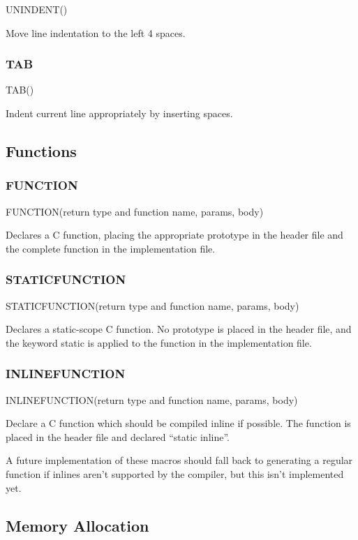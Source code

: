 \documentclass{article}
\begin{document}
UNINDENT()

Move line indentation to the left 4 spaces.


\subsubsection{TAB}

TAB()

Indent current line appropriately by inserting spaces.


\subsection{Functions}


\subsubsection{FUNCTION}

FUNCTION(return type and function name, params, body)

Declares a C function, placing the appropriate prototype in the header
file and the complete function in the implementation file.


\subsubsection{STATICFUNCTION}

STATICFUNCTION(return type and function name, params, body)

Declares a static-scope C function. No prototype is placed in the
header file, and the keyword static is applied to the function in
the implementation file.


\subsubsection{INLINEFUNCTION}

INLINEFUNCTION(return type and function name, params, body)

Declare a C function which should be compiled inline if possible.
The function is placed in the header file and declared ``static inline''.

A future implementation of these macros should fall back to
generating a regular function if inlines aren't supported by the
compiler, but this isn't implemented yet.


\subsection{Memory Allocation}
\end{document}
